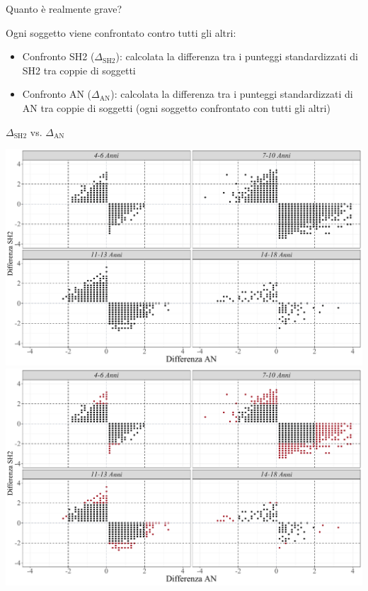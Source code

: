 \documentclass{beamer}
\begin{document}
\begin{frame}{Quanto è realmente grave?}
	

		
Ogni soggetto viene confrontato contro tutti gli altri: 

\vspace{3mm}

\begin{itemize}
\item  Confronto SH2 ($\Delta_{\text{SH2}}$): calcolata la differenza tra i punteggi standardizzati di SH2 tra coppie di soggetti 

\item  Confronto AN ($\Delta_{\text{AN}}$): calcolata la differenza tra i punteggi standardizzati di AN tra coppie di soggetti (ogni soggetto confrontato con tutti gli altri)
\end{itemize}


\begin{center}
	$\Delta_{\text{SH2}}$ vs. $\Delta_{\text{AN}}$
\end{center}


\end{frame}


\begin{frame}
	\begin{overprint}
		
		\includegraphics[width=\linewidth]{img/farfalle_gruppi.pdf}
		\onslide<2>\includegraphics[width=\linewidth]{img/farfalle_gruppi_colored.pdf}

		
		
	\end{overprint}
\end{frame}

 
\end{document}
